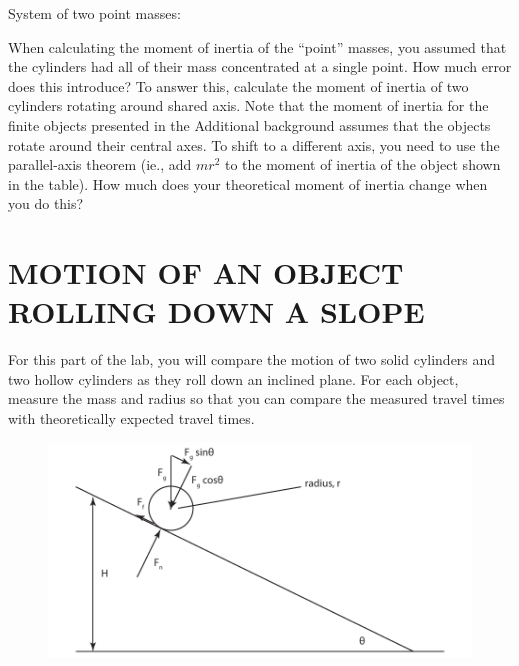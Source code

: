 \documentclass[11pt,letterpaper]{article}
\begin{document}
System of two point masses:\\
\vspace{6cm}

When calculating the moment of inertia of the ``point'' masses, you assumed that the cylinders had all of their mass concentrated at a single point. How much error does this introduce? To answer this, calculate the moment of inertia of two cylinders rotating around shared axis. Note that the moment of inertia for the finite objects presented in the Additional background assumes that the objects rotate around their central axes. To shift to a different axis, you need to use the parallel-axis theorem (ie., add $mr^2$ to the moment of inertia of the object shown in the table). How much does your theoretical moment of inertia change when you do this?

\section{MOTION OF AN OBJECT ROLLING DOWN A SLOPE}
For this part of the lab, you will compare the motion of two solid cylinders and two hollow cylinders as they roll down an inclined plane. For each object, measure the mass and radius so that you can compare the measured travel times with theoretically expected travel times. 



\begin{figure}[h]
\begin{center}
\includegraphics{./rolling_ball}
\end{center}
\end{figure}
\end{document}
